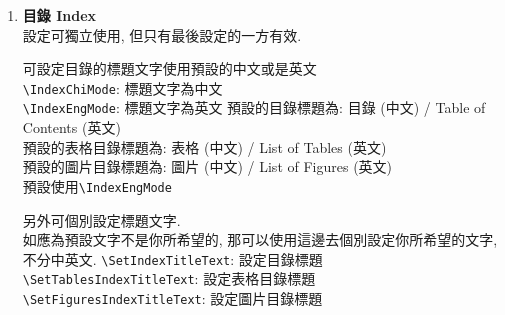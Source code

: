 \begin{enumerate}
{    而摘要中的關鍵字, 為了方便同學們能達到以下情況:\\
    a. 只寫中文版摘要\\
    b. 只寫英文版摘要\\
    c. 同時寫中英文版摘要\\
    故中英文版的關鍵字都是可個別設定.\\
    \verb|\SetAbstractChiKeywords|: 用來設定中文版摘要的關鍵字\\
    \verb|\SetAbstractEngKeywords|: 用來設定英文版摘要的關鍵字\\
    \verb|\SetAbstractExtKeywords|: 用來設定英文延伸摘要的關鍵字 (只有你要編寫英文延伸摘要才需要設定)\\
    所以只要使用你需要寫的版本則可. 但如果2個版本都要寫, 則2個都同時使用則可. 沒有填寫的話, 則摘要中的關鍵字部份是不會顯示出來.

    e.g\\
    \verb|\SetAbstractChiKeywords|{關鍵字 A}{關鍵字 B}{關鍵字 C}\\
    \verb|\SetAbstractEngKeywords|{Keyword A}{Keyword B}{Keyword C}\\
    \verb|\SetAbstractExtKeywords|{Keyword A}{Keyword B}{Keyword C}\\
    英文延伸摘要的關鍵字理應會跟英文版摘要的關鍵字是一樣, 但為了同學能編寫不同內容和關鍵字, 故可獨立設定.
  } %

  \item
  {
    \textbf{目錄 Index}\\
    設定可獨立使用, 但只有最後設定的一方有效.

    可設定目錄的標題文字使用預設的中文或是英文\\
    \verb|\IndexChiMode|:  標題文字為中文\\
    \verb|\IndexEngMode|:  標題文字為英文
    預設的目錄標題為: 目錄 (中文) / Table of Contents (英文)\\
    預設的表格目錄標題為: 表格 (中文) / List of Tables (英文)\\
    預設的圖片目錄標題為: 圖片 (中文) / List of Figures (英文)\\
    預設使用\verb|\IndexEngMode|

    另外可個別設定標題文字.\\
    如應為預設文字不是你所希望的, 那可以使用這邊去個別設定你所希望的文字, 不分中英文.
    \verb|\SetIndexTitleText|: 設定目錄標題\\
    \verb|\SetTablesIndexTitleText|: 設定表格目錄標題\\
    \verb|\SetFiguresIndexTitleText|: 設定圖片目錄標題
  } %


\end{enumerate}
